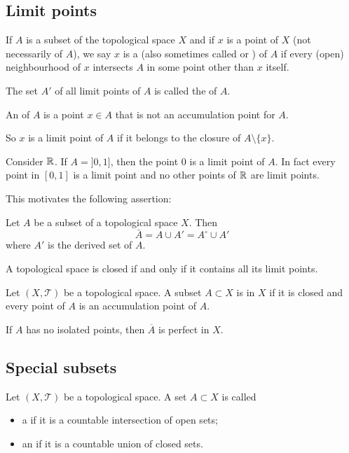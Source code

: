 \subsection{Limit points}
\begin{definition}
If $A$ is a subset of the topological space $X$ and if $x$ is a point of $X$ (not necessarily of $A$), we say $x$ is a  (also sometimes called  or ) of $A$ if every (open) neighbourhood of $x$ intersects $A$ in some point other than $x$ itself.

The set $A'$ of all limit points of $A$ is called the  of $A$.

An  of $A$ is a point $x\in A$ that is not an accumulation point for $A$.
\end{definition}
So $x$ is a limit point of $A$ if it belongs to the closure of $A\setminus \{x\}$.
\begin{example}
Consider $\mathbb{R}$. If $A= ]0,1]$, then the point $0$ is a limit point of $A$. In fact every point in $[0,1]$ is a limit point and no other points of $\mathbb{R}$ are limit points.
\end{example}
This motivates the following assertion:
\begin{proposition}
Let $A$ be a subset of a topological space $X$. Then
\[ \bar{A} = A \cup A' = A^\circ \cup A' \]
where $A'$ is the derived set of $A$.
\end{proposition}
\begin{corollary}
A topological space is closed if and only if it contains all its limit points.
\end{corollary}

\begin{definition}
Let $(X,\mathcal{T})$ be a topological space. A subset $A\subset X$ is  in $X$ if it is closed and every point of $A$ is an accumulation point of $A$.
\end{definition}
\begin{lemma}
If $A$ has no isolated points, then $\overline{A}$ is perfect in $X$.
\end{lemma}

\subsection{Special subsets}
\begin{definition}
Let $(X,\mathcal{T})$ be a topological space. A set $A\subset X$ is called
\begin{itemize}
\item a  if it is a countable intersection of open sets;
\item an  if it is a countable union of closed sets.
\end{itemize}
\end{definition}

